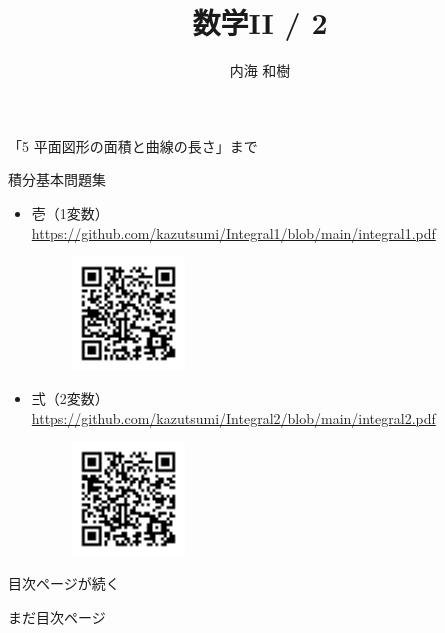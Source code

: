 \documentclass[10pt, uplatex, dvipdfmx]{jsarticle}
\title{\Huge 数学II / 2}
\author{\Large 内海 和樹}
\theoremstyle{definition}
\numberwithin{equation}{section}
\begin{document}
\maketitle

\begin{center}
  「5 平面図形の面積と曲線の長さ」まで
\end{center}

\vspace{5zh}
\begin{center}
  {\LARGE 積分基本問題集}

  \begin{itemize}
    \setlength{\itemsep}{2zh}
    
  \item 壱（1変数） \url{https://github.com/kazutsumi/Integral1/blob/main/integral1.pdf}
    \begin{figure}[h]
      \centering
      \includegraphics[width=3cm]{./pictures/QR/1.png}
    \end{figure}
    
  \item 弍（2変数） \url{https://github.com/kazutsumi/Integral2/blob/main/integral2.pdf}
    \begin{figure}[h]
      \centering
      \includegraphics[width=3cm]{./pictures/QR/2.png}
    \end{figure}
  \end{itemize}
\end{center}


\thispagestyle{empty}

\clearpage

\tableofcontents

\newpage

目次ページが続く

\newpage

まだ目次ページ
\end{document}
